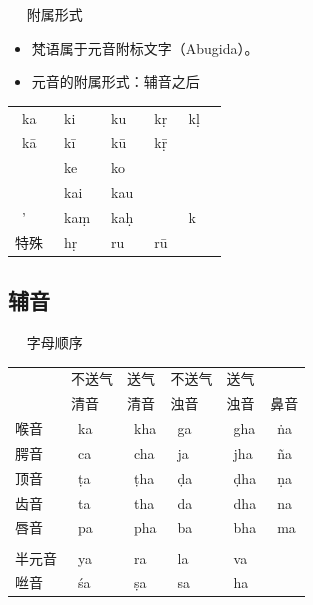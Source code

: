 \documentclass[17pt]{beamer}
\newcommand{\skt}[1]{{\sanskritfont{#1}}} %
\newcommand{\skttrans}[1]{{\skt{#1}~#1}}  %
\begin{document}
\begin{frame}{\insertsubsection ~~ 附属形式}
  \begin{itemize}
    \item 梵语属于元音附标文字（Abugida）。
    \item
      元音的附属形式：辅音之后
  \end{itemize}
  \centering
  \begin{tabular}{@{}llllll@{}} %
    \skttrans{ka} & \skttrans{ki} & \skttrans{ku} & \skttrans{kṛ} & \skttrans{kḷ}   \\
    \skttrans{kā} & \skttrans{kī} & \skttrans{kū} & \skttrans{kṝ} &  \\
    & \skttrans{ke} & \skttrans{ko} &  & \\
    & \skttrans{kai} & \skttrans{kau} &  & \\
    \skttrans{'} & \skttrans{kaṃ} & \skttrans{kaḥ} &  & \skttrans{k} \\
    特殊 & \skttrans{hṛ} & \skttrans{ru} & \skttrans{rū} &  \\
  \end{tabular}
\end{frame}

\subsection{辅音}


\begin{frame}{\insertsubsection ~~ 字母顺序}
  \small
  \begin{tabular}{@{}llllll@{}} %
     & 不送气  & 送气 & 不送气 & 送气 &   \\
     & 清音  & 清音 & 浊音 & 浊音 & 鼻音  \\
    喉音  & \skttrans{ka}  & \skttrans{kha} & \skttrans{ga} & \skttrans{gha} & \skttrans{ṅa} \\
    腭音  & \skttrans{ca}  & \skttrans{cha} & \skttrans{ja} & \skttrans{jha} & \skttrans{ña} \\
    顶音  & \skttrans{ṭa}  & \skttrans{ṭha} & \skttrans{ḍa} & \skttrans{ḍha} & \skttrans{ṇa} \\
    齿音  & \skttrans{ta}  & \skttrans{tha} & \skttrans{da} & \skttrans{dha} & \skttrans{na} \\
    唇音  & \skttrans{pa}  & \skttrans{pha} & \skttrans{ba} & \skttrans{bha} & \skttrans{ma} \\
      &  & &  & &   \\
    半元音  & \skttrans{ya}  & \skttrans{ra} & \skttrans{la} & \skttrans{va} &  \\
    咝音  & \skttrans{śa}  & \skttrans{ṣa} & \skttrans{sa} &  \skttrans{ha} & \\
  \end{tabular}
\end{frame}
\end{document}
